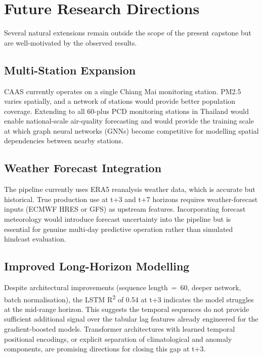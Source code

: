 \section{Future Research Directions}

Several natural extensions remain outside the scope of the present
capstone but are well-motivated by the observed results.

\subsection{Multi-Station Expansion}

CAAS currently operates on a single Chiang Mai monitoring station.
PM2.5 varies spatially, and a network of stations would provide better
population coverage. Extending to all 60-plus PCD monitoring stations
in Thailand would enable national-scale air-quality forecasting and
would provide the training scale at which graph neural networks
(GNNs) become competitive for modelling spatial dependencies between
nearby stations.

\subsection{Weather Forecast Integration}

The pipeline currently uses ERA5 reanalysis weather data, which is
accurate but historical. True production use at t+3 and t+7 horizons
requires weather-forecast inputs (ECMWF HRES or GFS) as upstream
features. Incorporating forecast meteorology would introduce forecast
uncertainty into the pipeline but is essential for genuine multi-day
predictive operation rather than simulated hindcast evaluation.

\subsection{Improved Long-Horizon Modelling}

Despite architectural improvements (sequence length~=~60, deeper
network, batch normalisation), the LSTM R\textsuperscript{2} of 0.54 at
t+3 indicates the model struggles at the mid-range horizon. This
suggests the temporal sequences do not provide sufficient additional
signal over the tabular lag features already engineered for the
gradient-boosted models. Transformer architectures with learned
temporal positional encodings, or explicit separation of climatological
and anomaly components, are promising directions for closing this
gap at t+3.

